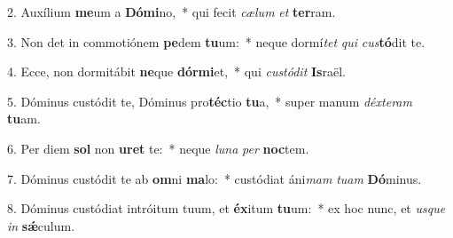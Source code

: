 2. Auxílium \textbf{me}um a \textbf{Dó}\textbf{mi}no,~*  qui fecit \textit{cæ}\textit{lum} \textit{et} \textbf{ter}ram.\

3. Non det in commotiónem \textbf{pe}dem \textbf{tu}um:~*  neque dormí\textit{tet} \textit{qui} \textit{cus}\textbf{tó}dit te.\

4. Ecce, non dormitábit \textbf{ne}que \textbf{dór}\textbf{mi}et,~*  qui \textit{cus}\textit{tó}\textit{dit} \textbf{Is}raël.\

5. Dóminus custódit te, Dóminus pro\textbf{téc}tio \textbf{tu}a,~*  super manum \textit{déx}\textit{te}\textit{ram} \textbf{tu}am.\

6. Per diem \textbf{sol} non \textbf{u}\textbf{ret} te:~*  neque \textit{lu}\textit{na} \textit{per} \textbf{noc}tem.\

7. Dóminus custódit te ab \textbf{om}ni \textbf{ma}lo:~*  custódiat áni\textit{mam} \textit{tu}\textit{am} \textbf{Dó}minus.\

8. Dóminus custódiat intróitum tuum, et \textbf{éx}itum \textbf{tu}um:~*  ex hoc nunc, et \textit{us}\textit{que} \textit{in} \textbf{sǽ}culum.\

